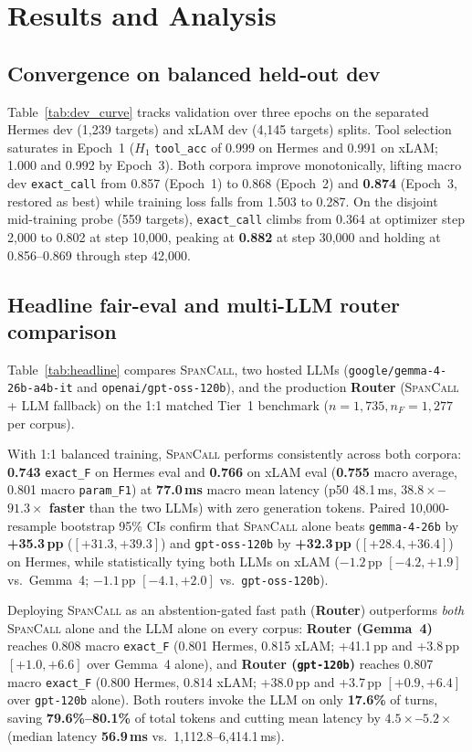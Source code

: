 \section{Results and Analysis}
\label{sec:results}

\subsection{Convergence on balanced held-out dev}
Table~\ref{tab:dev_curve} tracks validation over three epochs on the separated Hermes dev (1,239 targets) and xLAM dev (4,145 targets) splits. Tool selection saturates in Epoch~1 ($H_1$ \texttt{tool\_acc} of 0.999 on Hermes and 0.991 on xLAM; 1.000 and 0.992 by Epoch~3). Both corpora improve monotonically, lifting macro dev \texttt{exact\_call} from 0.857 (Epoch~1) to 0.868 (Epoch~2) and \textbf{0.874} (Epoch~3, restored as best) while training loss falls from 1.503 to 0.287. On the disjoint mid-training probe (559 targets), \texttt{exact\_call} climbs from 0.364 at optimizer step 2,000 to 0.802 at step 10,000, peaking at \textbf{0.882} at step 30,000 and holding at 0.856--0.869 through step 42,000.

\subsection{Headline fair-eval and multi-LLM router comparison}
Table~\ref{tab:headline} compares \textsc{SpanCall}, two hosted LLMs (\texttt{google/gemma-4-26b-a4b-it} and \texttt{openai/gpt-oss-120b}), and the production \textbf{Router} (\textsc{SpanCall} + LLM fallback) on the 1:1 matched Tier~1 benchmark ($n{=}1{,}735, n_F{=}1{,}277$ per corpus).

With 1:1 balanced training, \textsc{SpanCall} performs consistently across both corpora: \textbf{0.743} \texttt{exact\_F} on Hermes eval and \textbf{0.766} on xLAM eval (\textbf{0.755} macro average, 0.801 macro \texttt{param\_F1}) at \textbf{77.0\,ms} macro mean latency (p50 48.1\,ms, \textbf{$38.8\times$--$91.3\times$ faster} than the two LLMs) with zero generation tokens. Paired 10,000-resample bootstrap 95\% CIs confirm that \textsc{SpanCall} alone beats \texttt{gemma-4-26b} by \textbf{+35.3\,pp} ($[+31.3, +39.3]$) and \texttt{gpt-oss-120b} by \textbf{+32.3\,pp} ($[+28.4, +36.4]$) on Hermes, while statistically tying both LLMs on xLAM ($-1.2$\,pp $[-4.2, +1.9]$ vs.\ Gemma~4; $-1.1$\,pp $[-4.1, +2.0]$ vs.\ \texttt{gpt-oss-120b}).

Deploying \textsc{SpanCall} as an abstention-gated fast path (\textbf{Router}) outperforms \emph{both} \textsc{SpanCall} alone and the LLM alone on every corpus: \textbf{Router (Gemma~4)} reaches 0.808 macro \texttt{exact\_F} (0.801 Hermes, 0.815 xLAM; +41.1\,pp and +3.8\,pp $[+1.0, +6.6]$ over Gemma~4 alone), and \textbf{Router (\texttt{gpt-120b})} reaches 0.807 macro \texttt{exact\_F} (0.800 Hermes, 0.814 xLAM; +38.0\,pp and +3.7\,pp $[+0.9, +6.4]$ over \texttt{gpt-120b} alone). Both routers invoke the LLM on only \textbf{17.6\%} of turns, saving \textbf{79.6\%--80.1\%} of total tokens and cutting mean latency by \textbf{$4.5\times$--$5.2\times$} (median latency \textbf{56.9\,ms} vs.\ 1,112.8--6,414.1\,ms).

